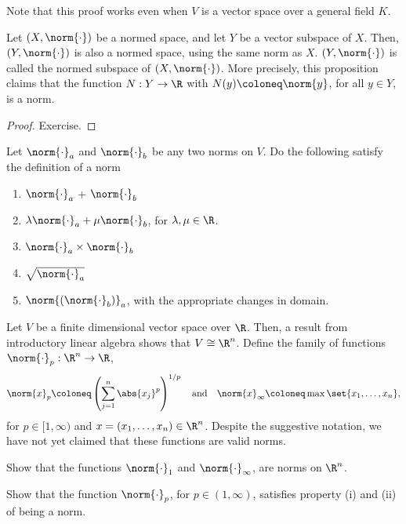 Note that this proof works even when $V$ is a vector space over a general field $K$.

\begin{nprop}
  Let $(X, \norm{\cdot})$ be a normed space, and let $Y$ be a vector subspace of $X$. Then, $(Y, \norm{\cdot})$ is also a normed space, using the same norm as $X$. $(Y, \norm{\cdot})$ is called the normed subspace of $(X, \norm{\cdot})$. More precisely, this proposition claims that the function $N:Y \to \R$ with $N(y) \coloneq \norm{y}$, for all $y \in Y$, is a norm.
\end{nprop}
\begin{proof}
  Exercise.
\end{proof}

\begin{nex}
  Let $\norm{\cdot}_a$ and $\norm{\cdot}_b$ be any two norms on $V$. Do the following satisfy the definition of a norm
  \begin{enumerate}
  \item $\norm{\cdot}_a$ + $\norm{\cdot}_b$
  \item $\lambda\norm{\cdot}_a + \mu\norm{\cdot}_b$, for $\lambda, \mu \in \R$.
  \item $\norm{\cdot}_a \times \norm{\cdot}_b$
  \item $\sqrt{\norm{\cdot}_{a}}$
  \item $\norm{\left(\norm{\cdot}_b\right)}_{a}$, with the appropriate changes in domain.
  \end{enumerate}
\end{nex}

Let $V$ be a finite dimensional vector space over $\R$. Then, a result from introductory linear algebra shows that $V \cong \R^n$. Define the family of functions $\norm{\cdot}_{p}:\R^n \to \R$,
\begin{equation*}
  \norm{x}_{p} \coloneq \left(\sum_{j=1}^{n} \abs{x_j}^{p}\right)^{1/p}
  \quad\text{and}\quad
  \norm{x}_{\infty} \coloneq \max \set{x_1, \dots, x_n},
\end{equation*}
for $p \in [1,\infty)$ and $x = (x_1, \dots, x_n) \in \R^n$. Despite the suggestive notation, we have not yet claimed that these functions are valid norms.

\begin{nex}
  Show that the functions $\norm{\cdot}_{1}$ and $\norm{\cdot}_{\infty}$, are norms on $\R^n$.
\end{nex}

\begin{nex}
  Show that the function $\norm{\cdot}_{p}$, for $p \in (1,\infty)$, satisfies property (i) and (ii) of being a norm.
\end{nex}

